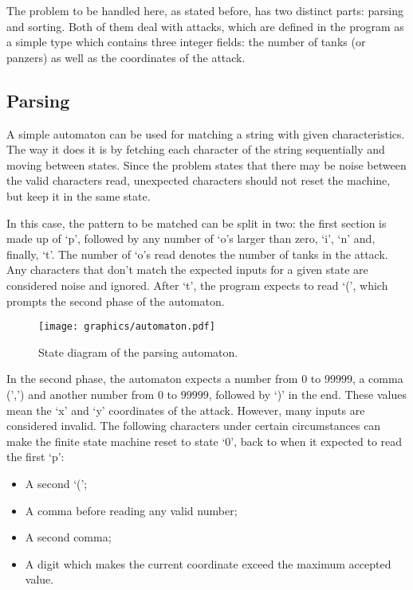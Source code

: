 \documentclass[10pt,a4paper]{article}
\numberwithin{equation}{section}
\begin{document}
The problem to be handled here, as stated before, has two distinct parts: parsing and sorting. Both of them deal with attacks, which are defined in the program as a simple type which contains three integer fields: the number of tanks (or panzers) as well as the coordinates of the attack.

\subsection{Parsing}

A simple automaton can be used for matching a string with given characteristics. The way it does it is by fetching each character of the string sequentially and moving between states. Since the problem states that there may be noise between the valid characters read, unexpected characters should not reset the machine, but keep it in the same state.

In this case, the pattern to be matched can be split in two: the first section is made up of `p', followed by any number of `o's larger than zero, `i', `n' and, finally, `t'. The number of `o's read denotes the number of tanks in the attack. Any characters that don't match the expected inputs for a given state are considered noise and ignored. After `t', the program expects to read `(', which prompts the second phase of the automaton.

\begin{figure}[H]
    \centering
    \texttt{[image: graphics/automaton.pdf]}
    \caption{State diagram of the parsing automaton.}
    \label{fig:automaton}
\end{figure}

In the second phase, the automaton expects a number from $0$ to $99999$, a comma (',') and another number from $0$ to $99999$, followed by `)' in the end. These values mean the `x' and `y' coordinates of the attack. However, many inputs are considered invalid. The following characters under certain circumstances can make the finite state machine reset to state `0', back to when it expected to read the first `p':

\begin{itemize}
    \item A second `(';
    \item A comma before reading any valid number;
    \item A second comma;
    \item A digit which makes the current coordinate exceed the maximum accepted value.
\end{itemize}
\end{document}

